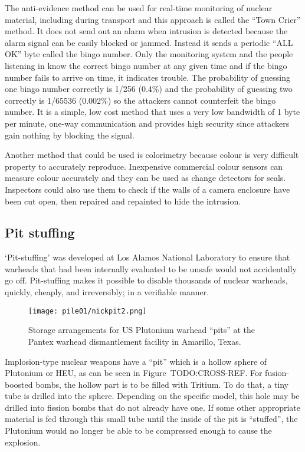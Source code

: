 \documentclass[twoside,titlepage,11pt,twocolumn,a4paper]{article}
\begin{document}
The anti-evidence method can be used for real-time monitoring of
nuclear material, including during transport and this approach is
called the ``Town Crier'' method. It does not send out an alarm when
intrusion is detected because the alarm signal can be easily blocked
or jammed. Instead it sends a periodic ``ALL OK'' byte called the
bingo number. Only the monitoring system and the people listening in
know the correct bingo number at any given time and if the bingo
number fails to arrive on time, it indicates trouble. The probability
of guessing one bingo number correctly is 1/256 (0.4\%) and the
probability of guessing two correctly is 1/65536 (0.002\%) so the
attackers cannot counterfeit the bingo number. It is a simple, low
cost method that uses a very low bandwidth of 1 byte per minute,
one-way communication and provides high security since attackers gain
nothing by blocking the signal. \citep{unconventionalCoC2010}

Another method that could be used is colorimetry because colour is
very difficult property to accurately reproduce. Inexpensive
commercial colour sensors can measure colour accurately and they can
be used as change detectors for seals. Inspectors could also use them
to check if the walls of a camera enclosure have been cut open, then
repaired and repainted to hide the
intrusion. \citep{unconventionalCoC2010}

\subsection{Pit stuffing}
`Pit-stuffing' was developed at Los Alamos National Laboratory 
to ensure that warheads that had been internally evaluated to be 
unsafe would not accidentally go off. Pit-stuffing makes it possible
to disable thousands of nuclear warheads, quickly, cheaply, and 
irreversibly; in a verifiable manner.

\begin{figure*}
  \texttt{[image: pile01/nickpit2.png]}
  \caption{Storage arrangements for US Plutonium warhead ``pits'' at
    the Pantex warhead dismantlement facility in Amarillo,
    Texas. \citep{IPFN2009}}
\end{figure*}

Implosion-type nuclear weapons have a ``pit'' which is a hollow sphere
of Plutonium or HEU, as can be seen in Figure~TODO:CROSS-REF. For
fusion-boosted bombs, the hollow part is to be filled with Tritium. To
do that, a tiny tube is drilled into the sphere. Depending on the
specific model, this hole may be drilled into fission bombs that do
not already have one. If some other appropriate material is fed
through this small tube until the inside of the pit is ``stuffed'',
the Plutonium would no longer be able to be compressed enough to cause
the explosion.
\end{document}
